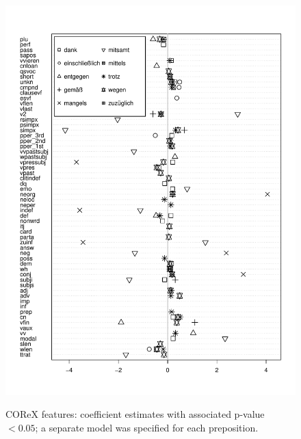 \begin{figure}
  \includegraphics[scale=.9]{../R/plots/prep-individual-coeffs-bw}
  \label{coeffs-corex-individial}
  \caption{COReX features: coefficient estimates with associated p-value $< 0.05$; a separate model was specified for each preposition.}
\end{figure}


